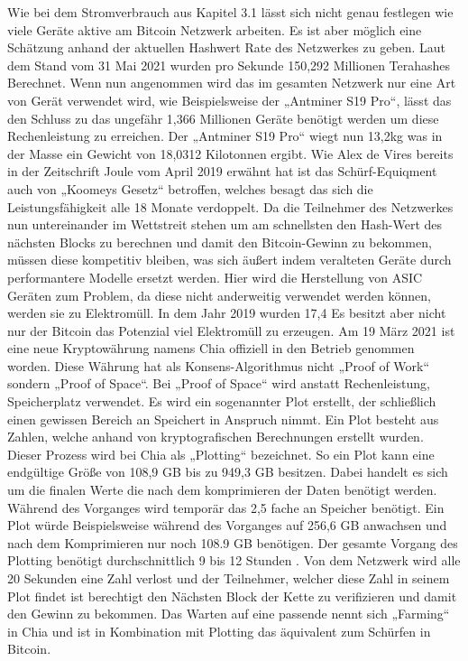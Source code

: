 \newline
Wie bei dem Stromverbrauch aus Kapitel 3.1 lässt sich nicht genau festlegen wie viele Geräte aktive am Bitcoin Netzwerk arbeiten. Es ist aber möglich eine Schätzung anhand der aktuellen Hashwert Rate \cite{blockchaincom_statistic_nodate} des Netzwerkes zu geben. Laut dem Stand vom 31 Mai 2021 wurden pro Sekunde 150,292 Millionen Terahashes Berechnet. Wenn nun angenommen wird das im gesamten Netzwerk nur eine Art von Gerät verwendet wird, wie Beispielsweise der „Antminer S19 Pro“, lässt das den Schluss zu das ungefähr 1,366 Millionen Geräte benötigt werden um diese Rechenleistung zu erreichen. Der „Antminer S19 Pro“ wiegt nun 13,2kg was in der Masse ein Gewicht von 18,0312 Kilotonnen ergibt. Wie Alex de Vires \cite{de_vries_renewable_2019} bereits in der Zeitschrift Joule vom April 2019 erwähnt hat ist das Schürf-Equiqment auch von „Koomeys Gesetz“ betroffen, welches besagt das sich die Leistungsfähigkeit alle 18 Monate verdoppelt. Da die Teilnehmer des Netzwerkes nun untereinander im Wettstreit stehen um am schnellsten den Hash-Wert des nächsten Blocks zu berechnen und damit den Bitcoin-Gewinn zu bekommen, müssen diese kompetitiv bleiben, was sich äußert indem veralteten Geräte durch performantere Modelle ersetzt werden. Hier wird die Herstellung von ASIC Geräten zum Problem, da diese nicht anderweitig verwendet werden können, werden sie zu Elektromüll. In dem Jahr 2019 wurden 17,4%
\newline
Es besitzt aber nicht nur der Bitcoin das Potenzial viel Elektromüll zu erzeugen. Am 19 März 2021 ist eine neue Kryptowährung namens Chia offiziell in den Betrieb genommen worden. Diese Währung hat als Konsens-Algorithmus nicht „Proof of Work“ sondern „Proof of Space“.  Bei „Proof of Space“ wird anstatt Rechenleistung, Speicherplatz verwendet. Es wird  ein sogenannter Plot erstellt, der schließlich einen gewissen Bereich an Speichert in Anspruch nimmt. Ein Plot besteht aus Zahlen, welche anhand von kryptografischen Berechnungen erstellt wurden. Dieser Prozess wird bei Chia als „Plotting“ bezeichnet. So ein Plot kann eine endgültige Größe von 108,9 GB bis zu 949,3 GB \cite{hoffman_plot_2021} besitzen. Dabei handelt es sich um die finalen Werte die nach dem komprimieren der Daten benötigt werden. Während des Vorganges wird temporär das 2,5 fache an Speicher benötigt. Ein Plot würde Beispielsweise während des Vorganges auf 256,6 GB anwachsen und nach dem Komprimieren nur noch 108.9 GB benötigen. Der gesamte Vorgang des Plotting benötigt durchschnittlich 9 bis 12 Stunden \cite{hoffman_chia_2021}. Von dem Netzwerk wird alle 20 Sekunden eine Zahl verlost und der Teilnehmer, welcher diese Zahl in seinem Plot findet ist berechtigt den Nächsten Block der Kette zu verifizieren und damit den Gewinn zu bekommen. Das Warten auf eine passende nennt sich „Farming“ in Chia und ist in Kombination mit Plotting das äquivalent zum Schürfen in Bitcoin.
\newline

